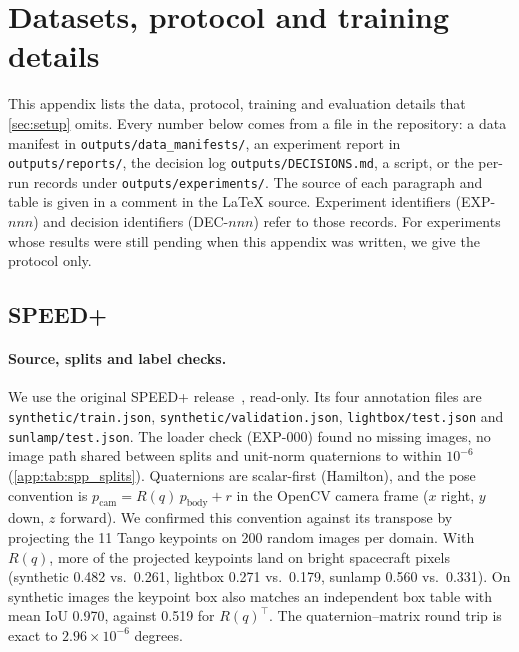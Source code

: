 \section{Datasets, protocol and training details}\label{app:protocol}

This appendix lists the data, protocol, training and evaluation details that \cref{sec:setup} omits. Every number below comes from a file in the repository: a data manifest in \texttt{outputs/data\_manifests/}, an experiment report in \texttt{outputs/reports/}, the decision log \texttt{outputs/DECISIONS.md}, a script, or the per-run records under \texttt{outputs/experiments/}. The source of each paragraph and table is given in a comment in the \LaTeX{} source. Experiment identifiers (EXP-$nnn$) and decision identifiers (DEC-$nnn$) refer to those records. For experiments whose results were still pending when this appendix was written, we give the protocol only.

\subsection{SPEED+}\label{app:speedplus}

\paragraph{Source, splits and label checks.}
We use the original SPEED+ release~\cite{park2022speedplus}, read-only. Its four annotation files are \texttt{synthetic/train.json}, \texttt{synthetic/validation.json}, \texttt{lightbox/test.json} and \texttt{sunlamp/test.json}. The loader check (EXP-000) found no missing images, no image path shared between splits and unit-norm quaternions to within $10^{-6}$ (\cref{app:tab:spp_splits}). Quaternions are scalar-first (Hamilton), and the pose convention is $p_{\text{cam}}=R(q)\,p_{\text{body}}+r$ in the OpenCV camera frame ($x$ right, $y$ down, $z$ forward).
We confirmed this convention against its transpose by projecting the 11 Tango keypoints on 200 random images per domain. With $R(q)$, more of the projected keypoints land on bright spacecraft pixels (synthetic 0.482 vs.\ 0.261, lightbox 0.271 vs.\ 0.179, sunlamp 0.560 vs.\ 0.331). On synthetic images the keypoint box also matches an independent box table with mean IoU 0.970, against 0.519 for $R(q)^\top$. The quaternion--matrix round trip is exact to $2.96\times10^{-6}$ degrees.

